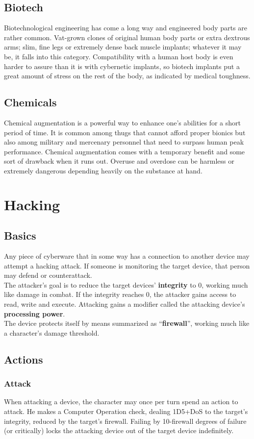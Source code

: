 \documentclass[12pt,a4paper]{book}
\begin{document}
	\section{Biotech}
	Biotechnological engineering has come a long way and engineered body parts are rather common. Vat-grown clones of original human body parts or extra dextrous arms; slim, fine legs or extremely dense back muscle implants; whatever it may be, it falls into this category.
	Compatibility with a human host body is even harder to assure than it is with cybernetic implants, so biotech implants put a great amount of stress on the rest of the body, as indicated by medical toughness.
	\section{Chemicals}
	Chemical augmentation is a powerful way to enhance one’s abilities for a short period of time. It is common among thugs that cannot afford proper bionics but also among military and mercenary personnel that need to surpass human peak performance. Chemical augmentation comes with a temporary benefit and some sort of drawback when it runs out. Overuse and overdose can be harmless or extremely dangerous depending heavily on the substance at hand.
	
	\chapter{Hacking}
	\section{Basics}
	Any piece of cyberware that in some way has a connection to another device may attempt a hacking attack. If someone is monitoring the target device, that person may defend or counterattack.\\
	The attacker’s goal is to reduce the target devices’ \textbf{integrity} to 0, working much like damage in combat. If the integrity reaches 0, the attacker gains access to read, write and execute. Attacking gains a modifier called the attacking device’s \textbf{processing power}.\\
	The device protects itself by means summarized as “\textbf{firewall}”, working much like a character’s damage threshold.
	\section{Actions}
	\subsection*{Attack}
	When attacking a device, the character may once per turn spend an action to attack. He makes a Computer Operation check, dealing 1D5+DoS to the target’s integrity, reduced by the target’s firewall. Failing by 10-firewall degrees of failure (or critically) locks the attacking device out of the target device indefinitely.
\end{document}
